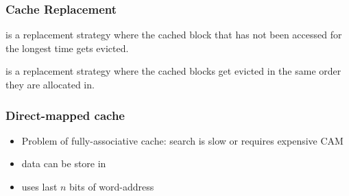 \documentclass{article}
\begin{document}
\subsubsection{Cache Replacement}

\begin{definition}
	 is a replacement strategy where the cached block that has not been accessed
	for the longest time gets evicted.
\end{definition}
\begin{definition}
	 is a replacement strategy where the cached blocks get evicted in the same order they are 
	allocated in.
\end{definition}

\subsubsection{Direct-mapped cache}

\begin{itemize}
	\item Problem of fully-associative cache: search is slow or requires expensive CAM
	\item data can be store in 
	\item uses last $n$ bits of word-address
\end{itemize}
\end{document}
